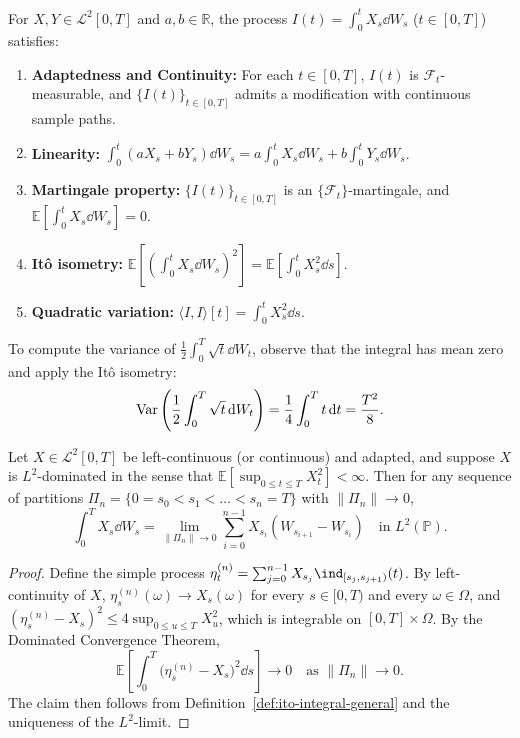 \begin{proposition}
\label{prop:ito-general-props}
For $X, Y \in \mathcal{L}^2[0, T]$ and $a, b \in \mathbb{R}$, the process $I(t) = \int_0^t X_s \dd W_s$ ($t \in [0, T]$) satisfies:
\begin{enumerate}
    \item \textbf{Adaptedness and Continuity:} For each $t \in [0, T]$, $I(t)$ is $\mathcal{F}_t$-measurable, and $\{I(t)\}_{t \in [0, T]}$ admits a modification with continuous sample paths.
    \item \textbf{Linearity:} $\int_0^t (a X_s + b Y_s)\dd W_s = a \int_0^t X_s \dd W_s + b \int_0^t Y_s \dd W_s$.
    \item \textbf{Martingale property:} $\{I(t)\}_{t \in [0, T]}$ is an $\{\mathcal{F}_t\}$-martingale, and $\mathbb{E}\left[\int_0^t X_s \dd W_s\right] = 0$.
    \item \textbf{It\^o isometry:} $\mathbb{E}\left[\left(\int_0^t X_s \dd W_s\right)^2\right] = \mathbb{E}\left[\int_0^t X_s^2 \dd s\right]$.
    \item \textbf{Quadratic variation:} $\langle I, I \rangle[t] = \int_0^t X_s^2 \dd s$.
\end{enumerate}
\end{proposition}

\begin{example}
\label{ex:ito-isometry-sqrt}
To compute the variance of $\frac{1}{2} \int_0^T \sqrt{t}\dd W_t$, observe that the integral has mean zero and apply the It\^o isometry:
\[
\operatorname{Var}\left(\frac{1}{2}\int_0^T \sqrt{t}\,\mathrm{d} W_t\right) = \frac{1}{4}\int_0^T t\,\mathrm{d} t = \frac{T^2}{8}.
\]
\end{example}

\begin{corollary}
\label{cor:ito-riemann-sum}
Let $X \in \mathcal{L}^2[0, T]$ be left-continuous (or continuous) and adapted, and suppose $X$ is $L^2$-dominated in the sense that $\mathbb{E}\left[\sup_{0 \le t \le T} X_t^2\right] < \infty$. Then for any sequence of partitions $\Pi_n = \{0 = s_0 < s_1 < \dots < s_n = T\}$ with $\|\Pi_n\| \to 0$,
\[
\int_0^T X_s \dd W_s = \lim_{\|\Pi_n\| \to 0} \sum_{i=0}^{n-1} X_{s_i}(W_{s_{i+1}} - W_{s_i}) \quad \text{in } L^2(\mathbb{P}).
\]
\end{corollary}
\begin{proof}
Define the simple process $\eta_t^{(n)} = \sum_{j=0}^{n-1} X_{s_j} \ind_{[s_j, s_{j+1})}(t)$. By left-continuity of $X$, $\eta_s^{(n)}(\omega) \to X_s(\omega)$ for every $s \in [0, T)$ and every $\omega \in \Omega$, and $(\eta_s^{(n)} - X_s)^2 \le 4 \sup_{0 \le u \le T} X_u^2$, which is integrable on $[0, T] \times \Omega$. By the Dominated Convergence Theorem,
\[
\mathbb{E}\left[\int_0^T \big(\eta_s^{(n)} - X_s\big)^2 \dd s\right] \to 0 \quad \text{as } \|\Pi_n\| \to 0.
\]
The claim then follows from Definition~\ref{def:ito-integral-general} and the uniqueness of the $L^2$-limit.
\end{proof}

